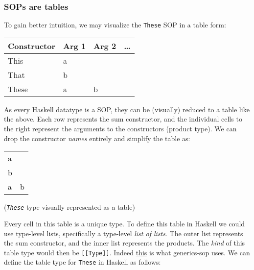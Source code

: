 \hypertarget{sops-are-tables}{%
\subsubsection{SOPs are tables}\label{sops-are-tables}}

To gain better intuition, we may visualize the \texttt{These} SOP in a
table form:

\begin{longtable}[]{@{}llll@{}}
\toprule
Constructor & Arg 1 & Arg 2 & \ldots{} \\
\midrule
\endhead
This & a & & \\
That & b & & \\
These & a & b & \\
\bottomrule
\end{longtable}

As every Haskell datatype is a SOP, they can be (visually) reduced to a
table like the above. Each row represents the sum constructor, and the
individual cells to the right represent the arguments to the
constructors (product type). We can drop the constructor \emph{names}
entirely and simplify the table as:

\begin{longtable}[]{@{}ll@{}}
\toprule
\endhead
a & \\
b & \\
a & b \\
\bottomrule
\end{longtable}

(\emph{\texttt{These}} type visually represented as a table)

Every cell in this table is a unique type. To define this table in
Haskell we could use type-level lists, specifically a type-level
\emph{list of lists}. The outer list represents the sum constructor, and
the inner list represents the products. The \emph{kind} of this table
type would then be \texttt{{[}{[}Type{]}{]}}. Indeed
\href{https://hackage.haskell.org/package/generics-sop-0.5.1.2/docs/Generics-SOP.html\#t:Code}{this}
is what generics-sop uses. We can define the table type for
\texttt{These} in Haskell as follows:

\begin{Shaded}
\begin{Highlighting}[]
 \OtherTok{=}
\NormalTok{  \textquotesingle{}[ \textquotesingle{}[ a ]}
\NormalTok{     \textquotesingle{}[ b ]}
\NormalTok{     \textquotesingle{}[ a, b ]}
\NormalTok{  ]}
\end{Highlighting}
\end{Shaded}

